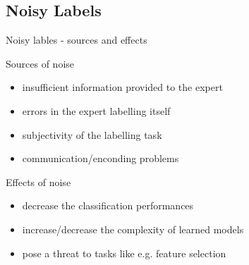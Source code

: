 \documentclass{beamer}\usepackage[]{graphicx}\usepackage[]{color}
\begin{document}
\subsection{Noisy Labels}
\begin{frame}[fragile]{Noisy lables - sources and effects\footnotemark[4]}
\small
\begin{minipage}[c]{0.6\textwidth}
\begin{block}{\small Sources of noise}
\begin{itemize}
\item insufficient information provided to the expert
\item errors in the expert labelling itself
\item subjectivity of the labelling task
\item communication/enconding problems
\end{itemize}
\end{block}
\begin{block}{\small Effects of noise}
\begin{itemize}
\item decrease the classification performances
\item increase/decrease the complexity of learned models
\item pose a threat to tasks like e.g. feature selection
\end{itemize}
\end{block}
\end{minipage}%
\begin{minipage}[c]{0.4\textwidth}
\begin{figure}%
    \centering
    \qquad

\end{figure}
\end{minipage}
\end{frame}
\end{document}
